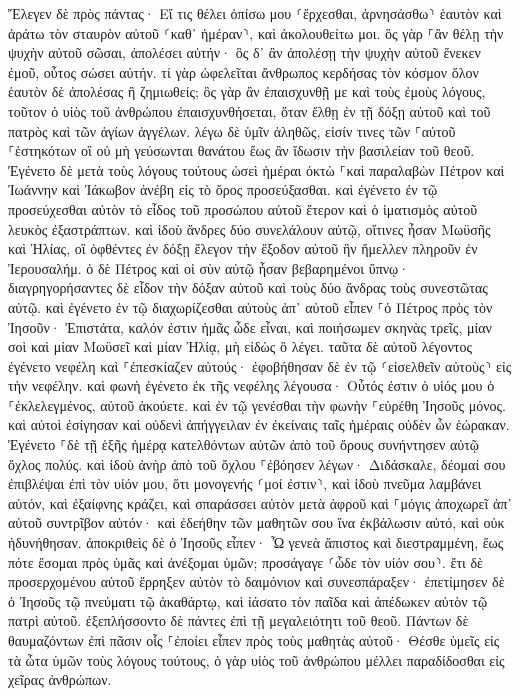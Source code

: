 \documentclass[twoside, 9pt]{extreport}
\begin{document}
Ἔλεγεν δὲ πρὸς πάντας· Εἴ τις θέλει ὀπίσω μου ⸂ἔρχεσθαι, ἀρνησάσθω⸃ ἑαυτὸν καὶ ἀράτω τὸν σταυρὸν αὐτοῦ ⸂καθ᾽ ἡμέραν⸃, καὶ ἀκολουθείτω μοι. 
ὃς γὰρ ⸀ἂν θέλῃ τὴν ψυχὴν αὐτοῦ σῶσαι, ἀπολέσει αὐτήν· ὃς δ᾽ ἂν ἀπολέσῃ τὴν ψυχὴν αὐτοῦ ἕνεκεν ἐμοῦ, οὗτος σώσει αὐτήν. 
τί γὰρ ὠφελεῖται ἄνθρωπος κερδήσας τὸν κόσμον ὅλον ἑαυτὸν δὲ ἀπολέσας ἢ ζημιωθείς; 
ὃς γὰρ ἂν ἐπαισχυνθῇ με καὶ τοὺς ἐμοὺς λόγους, τοῦτον ὁ υἱὸς τοῦ ἀνθρώπου ἐπαισχυνθήσεται, ὅταν ἔλθῃ ἐν τῇ δόξῃ αὐτοῦ καὶ τοῦ πατρὸς καὶ τῶν ἁγίων ἀγγέλων. 
λέγω δὲ ὑμῖν ἀληθῶς, εἰσίν τινες τῶν ⸀αὐτοῦ ⸀ἑστηκότων οἳ οὐ μὴ γεύσωνται θανάτου ἕως ἂν ἴδωσιν τὴν βασιλείαν τοῦ θεοῦ. 
Ἐγένετο δὲ μετὰ τοὺς λόγους τούτους ὡσεὶ ἡμέραι ὀκτὼ ⸀καὶ παραλαβὼν Πέτρον καὶ Ἰωάννην καὶ Ἰάκωβον ἀνέβη εἰς τὸ ὄρος προσεύξασθαι. 
καὶ ἐγένετο ἐν τῷ προσεύχεσθαι αὐτὸν τὸ εἶδος τοῦ προσώπου αὐτοῦ ἕτερον καὶ ὁ ἱματισμὸς αὐτοῦ λευκὸς ἐξαστράπτων. 
καὶ ἰδοὺ ἄνδρες δύο συνελάλουν αὐτῷ, οἵτινες ἦσαν Μωϋσῆς καὶ Ἠλίας, 
οἳ ὀφθέντες ἐν δόξῃ ἔλεγον τὴν ἔξοδον αὐτοῦ ἣν ἤμελλεν πληροῦν ἐν Ἰερουσαλήμ. 
ὁ δὲ Πέτρος καὶ οἱ σὺν αὐτῷ ἦσαν βεβαρημένοι ὕπνῳ· διαγρηγορήσαντες δὲ εἶδον τὴν δόξαν αὐτοῦ καὶ τοὺς δύο ἄνδρας τοὺς συνεστῶτας αὐτῷ. 
καὶ ἐγένετο ἐν τῷ διαχωρίζεσθαι αὐτοὺς ἀπ᾽ αὐτοῦ εἶπεν ⸀ὁ Πέτρος πρὸς τὸν Ἰησοῦν· Ἐπιστάτα, καλόν ἐστιν ἡμᾶς ὧδε εἶναι, καὶ ποιήσωμεν σκηνὰς τρεῖς, μίαν σοὶ καὶ μίαν Μωϋσεῖ καὶ μίαν Ἠλίᾳ, μὴ εἰδὼς ὃ λέγει. 
ταῦτα δὲ αὐτοῦ λέγοντος ἐγένετο νεφέλη καὶ ⸀ἐπεσκίαζεν αὐτούς· ἐφοβήθησαν δὲ ἐν τῷ ⸂εἰσελθεῖν αὐτοὺς⸃ εἰς τὴν νεφέλην. 
καὶ φωνὴ ἐγένετο ἐκ τῆς νεφέλης λέγουσα· Οὗτός ἐστιν ὁ υἱός μου ὁ ⸀ἐκλελεγμένος, αὐτοῦ ἀκούετε. 
καὶ ἐν τῷ γενέσθαι τὴν φωνὴν ⸀εὑρέθη Ἰησοῦς μόνος. καὶ αὐτοὶ ἐσίγησαν καὶ οὐδενὶ ἀπήγγειλαν ἐν ἐκείναις ταῖς ἡμέραις οὐδὲν ὧν ἑώρακαν. 
Ἐγένετο ⸀δὲ τῇ ἑξῆς ἡμέρᾳ κατελθόντων αὐτῶν ἀπὸ τοῦ ὄρους συνήντησεν αὐτῷ ὄχλος πολύς. 
καὶ ἰδοὺ ἀνὴρ ἀπὸ τοῦ ὄχλου ⸀ἐβόησεν λέγων· Διδάσκαλε, δέομαί σου ἐπιβλέψαι ἐπὶ τὸν υἱόν μου, ὅτι μονογενής ⸂μοί ἐστιν⸃, 
καὶ ἰδοὺ πνεῦμα λαμβάνει αὐτόν, καὶ ἐξαίφνης κράζει, καὶ σπαράσσει αὐτὸν μετὰ ἀφροῦ καὶ ⸀μόγις ἀποχωρεῖ ἀπ᾽ αὐτοῦ συντρῖβον αὐτόν· 
καὶ ἐδεήθην τῶν μαθητῶν σου ἵνα ἐκβάλωσιν αὐτό, καὶ οὐκ ἠδυνήθησαν. 
ἀποκριθεὶς δὲ ὁ Ἰησοῦς εἶπεν· Ὦ γενεὰ ἄπιστος καὶ διεστραμμένη, ἕως πότε ἔσομαι πρὸς ὑμᾶς καὶ ἀνέξομαι ὑμῶν; προσάγαγε ⸂ὧδε τὸν υἱόν σου⸃. 
ἔτι δὲ προσερχομένου αὐτοῦ ἔρρηξεν αὐτὸν τὸ δαιμόνιον καὶ συνεσπάραξεν· ἐπετίμησεν δὲ ὁ Ἰησοῦς τῷ πνεύματι τῷ ἀκαθάρτῳ, καὶ ἰάσατο τὸν παῖδα καὶ ἀπέδωκεν αὐτὸν τῷ πατρὶ αὐτοῦ. 
ἐξεπλήσσοντο δὲ πάντες ἐπὶ τῇ μεγαλειότητι τοῦ θεοῦ. Πάντων δὲ θαυμαζόντων ἐπὶ πᾶσιν οἷς ⸀ἐποίει εἶπεν πρὸς τοὺς μαθητὰς αὐτοῦ· 
Θέσθε ὑμεῖς εἰς τὰ ὦτα ὑμῶν τοὺς λόγους τούτους, ὁ γὰρ υἱὸς τοῦ ἀνθρώπου μέλλει παραδίδοσθαι εἰς χεῖρας ἀνθρώπων. 
\end{document}
